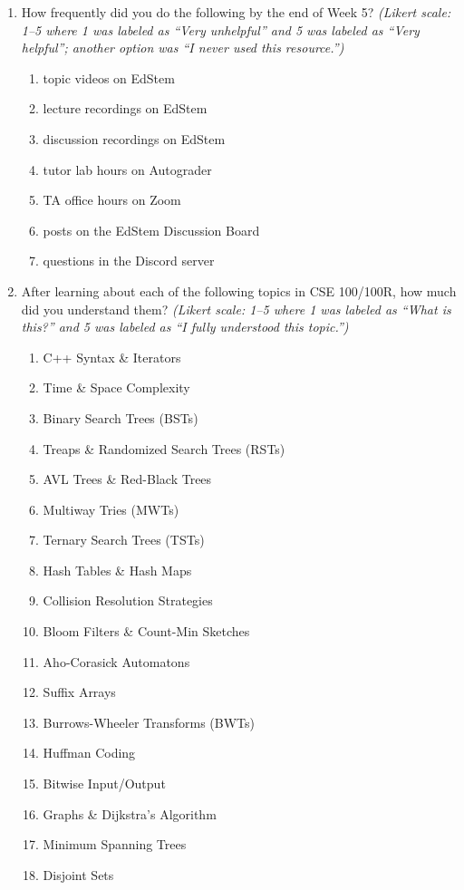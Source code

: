 \begin{enumerate}
    \item How frequently did you do the following by the end of Week 5? \textit{(Likert scale: 1–5 where 1 was labeled as ``Very unhelpful'' and 5 was labeled as ``Very helpful''; another option was ``I never used this resource.'')}
    \begin{enumerate}
        \item topic videos on EdStem
        \item lecture recordings on EdStem
        \item discussion recordings on EdStem
        \item tutor lab hours on Autograder
        \item TA office hours on Zoom
        \item posts on the EdStem Discussion Board
        \item questions in the Discord server
    \end{enumerate}

    \item After learning about each of the following topics in CSE 100/100R, how much did you understand them? \textit{(Likert scale: 1–5 where 1 was labeled as ``What is this?'' and 5 was labeled as ``I fully understood this topic.'')}
    \begin{enumerate}
        \item C++ Syntax \& Iterators
        \item Time \& Space Complexity
        \item Binary Search Trees (BSTs)
        \item Treaps \& Randomized Search Trees (RSTs)
        \item AVL Trees \& Red-Black Trees
        \item Multiway Tries (MWTs)
        \item Ternary Search Trees (TSTs)
        \item Hash Tables \& Hash Maps
        \item Collision Resolution Strategies
        \item Bloom Filters \& Count-Min Sketches
        \item Aho-Corasick Automatons
        \item Suffix Arrays
        \item Burrows-Wheeler Transforms (BWTs)
        \item Huffman Coding
        \item Bitwise Input/Output
        \item Graphs \& Dijkstra's Algorithm
        \item Minimum Spanning Trees
        \item Disjoint Sets
    \end{enumerate}


\end{enumerate}
